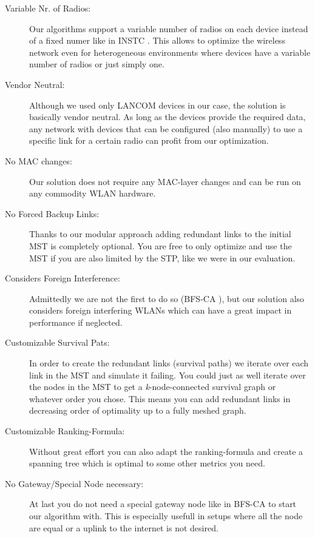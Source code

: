       \begin{description}
	\item [Variable Nr. of Radios:] Our algorithms support a variable number of radios on each device instead of a fixed numer like in INSTC \cite{INSTC}. 
	  This allows to optimize the wireless network even for heterogeneous environments where devices have a variable number of radios or just simply one.
	\item [Vendor Neutral:] Although we used only LANCOM devices in our case, the solution is basically vendor neutral. As long as the devices provide the required data,
	  any network with devices that can be configured (also manually) to use a specific link for a certain radio can profit from our optimization.
	\item [No MAC changes:] Our solution does not require any \ac{MAC}-layer changes and can be run on any commodity \ac{WLAN} hardware.
	\item [No Forced Backup Links:] Thanks to our modular approach adding redundant links to the initial \ac{MST} is completely optional. 
	  You are free to only optimize and use the MST if you are also limited by the STP, like we were in our evaluation.
	\item [Considers Foreign Interference:] Admittedly we are not the first to do so (BFS-CA \cite{BFS-CA}), but our solution also 
	  considers foreign interfering WLANs which can have a great impact in performance if neglected.
	\item [Customizable Survival Pats:] In order to create the redundant links (survival paths) we iterate over each link in the MST and simulate it failing.
	  You could just as well iterate over the nodes in the MST to get a \textit{k}-node-connected survival graph or whatever order you chose.
	  This means you can add redundant links in decreasing order of optimality up to a fully meshed graph.
	\item [Customizable Ranking-Formula:] Without great effort you can also adapt the ranking-formula and create a spanning tree which is optimal to some other metrics you need.
	\item [No Gateway/Special Node necessary:] At last you do not need a special gateway node like in BFS-CA \cite{BFS-CA} to start our algorithm with.
	  This is especially usefull in setups where all the node are equal or a uplink to the internet is not desired.
      \end{description}